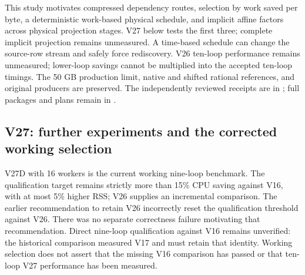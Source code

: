 \documentclass[11pt]{article}
\begin{document}
This study motivates compressed dependency routes, selection by work saved
per byte, a deterministic work-based physical schedule, and implicit affine
factors across physical projection stages. V27 below tests the first three;
complete implicit projection remains unmeasured. A time-based
schedule can change the source-row stream and safely force rediscovery.
V26 ten-loop performance remains unmeasured; lower-loop savings cannot be
multiplied into the accepted ten-loop timings. The 50 GB production limit,
native and shifted rational references, and original producers are preserved.
The independently reviewed receipts are in ;
full packages and plans remain in .

\subsection{V27: further experiments and the corrected working selection}
V27D with 16 workers is the current working nine-loop benchmark. The
qualification target remains strictly more than 15\% CPU saving against
V16, with at most 5\% higher RSS; V26 supplies an incremental comparison.
The earlier recommendation to retain V26 incorrectly reset the qualification
threshold against V26. There was no separate correctness failure motivating
that recommendation. Direct nine-loop qualification against V16 remains
unverified: the historical comparison measured V17 and must retain that
identity. Working selection does not assert that the missing V16 comparison
has passed or that ten-loop V27 performance has been measured.
\end{document}
